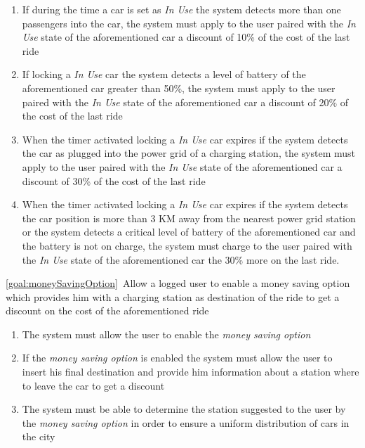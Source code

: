 \begin{description}
\begin{enumerate}[resume*]
{  				Use} the system must set the car state to \emph{Not Available} stating that reason
  				as description
  				\item If during the time a car is set as \emph{In Use} the system detects more than
  				one passengers into the car, the system must apply to the user paired with
  				the \emph{In Use} state of the aforementioned car a discount of 10\% of the cost
  				of the last ride
  				\item If locking  a \emph{In Use} car the system detects a level of battery of the
  				aforementioned car greater than 50\%, the system must apply to the user paired with
  				the \emph{In Use} state of the aforementioned car a discount of 20\% of the cost
  				of the last ride
  				\item When the timer activated locking a \emph{In Use} car expires if the system
  				detects the car as plugged into the power grid of a charging station, the system must
  				apply to the user paired with the \emph{In Use} state of the aforementioned car a
  				discount of 30\% of the cost of the last ride
  				\item When the timer activated locking a \emph{In Use} car expires if the system
  				detects the car position is more than 3 KM away from the nearest power grid station
  				or the system detects a critical level of battery of the aforementioned car and the
  				battery is not on charge, the system must charge to the user paired with the \emph{In
  				Use} state of the aforementioned car the 30\% more on the last ride. 
   			\end{enumerate}
  		\item \ref{goal:moneySavingOption}\ Allow a logged user to enable a money saving option which provides him with a charging station as destination of the ride to get a discount on the cost of the aforementioned ride
  			\begin{enumerate}[resume*]
  				\item The system must allow the user to enable the \emph{money saving option}
  				\item If the  \emph{money saving option} is enabled the system must allow the user
  				to insert his final destination and provide him information about a station where to
  				leave the car to get a discount
  				\item The system must be able to determine the station suggested to the user by the
  				\emph{money saving option} in order to ensure a uniform distribution of cars in the
  				city

\end{enumerate}
\end{description}
